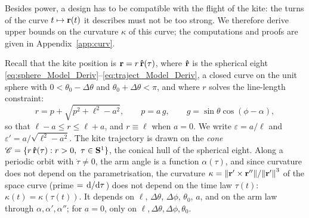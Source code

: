 Besides power, a design has to be compatible with the flight of the kite: the turns of the curve \(t\mapsto\vb r(t)\) it describes must not be too strong.
We therefore derive upper bounds on the curvature \(\kappa\) of this curve; the computations and proofs are given in Appendix~\ref{app:curv}.

Recall that the kite position is \(\vb r = r\,\vu r(\tau)\), where \(\vu r\) is the spherical eight \eqref{eq:sphere_Model_Deriv}--\eqref{eq:traject_Model_Deriv}, a closed curve on the unit sphere with \(0<\theta_0-\Delta\theta\) and \(\theta_0+\Delta\theta<\pi\), and where \(r\) solves the line-length constraint:
\begin{equation}
    r = p + \sqrt{p^2+\ell^2-a^2}, \qquad p = a\,g, \qquad g = \sin\theta\cos(\phi-\alpha),
\end{equation}
so that \(\ell-a\le r\le\ell+a\), and \(r\equiv\ell\) when \(a=0\).
We write \(\varepsilon = a/\ell\) and \(\varepsilon' = a/\sqrt{\ell^2-a^2}\).
The kite trajectory is drawn on the \emph{cone} \(\mathscr C = \{r\,\vu r(\tau) : r>0,\ \tau\in\mathbf{S}^1\}\), the conical hull of the spherical eight.
Along a periodic orbit with \(\dot\tau\ne0\), the arm angle is a function \(\alpha(\tau)\), and since curvature does not depend on the parametrisation, the curvature \(\kappa = \norm{\vb r'\times\vb r''}/\norm{\vb r'}^3\) of the space curve (prime \(=\dv*{}{\tau}\)) does not depend on the time law \(\tau(t)\): \(\kappa(t) = \kappa(\tau(t))\).
It depends on \(\ell\), \(\Delta\theta\), \(\Delta\phi\), \(\theta_0\), \(a\), and on the arm law through \(\alpha,\alpha',\alpha''\); for \(a=0\), only on \(\ell,\Delta\theta,\Delta\phi,\theta_0\).

